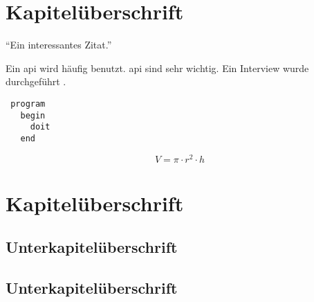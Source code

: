 \documentclass{custom}
\begin{document}
\mycover
\myconfidentiality

\begin{frontmatter}

\mytableofcontents
\mylistoffigures
\mylistoftables
\mylistofacronyms

\end{frontmatter}

\begin{mainmatter}

\section{Kapitelüberschrift}

\enquote{Ein interessantes Zitat.} \cite[1]{test}

Ein \gls{api} wird häufig benutzt. \gls{api} sind sehr wichtig. Ein Interview wurde durchgeführt .

\begin{verbatim}
 program
   begin
     doit
   end
\end{verbatim}

\begin{equation}
V= \pi \cdot r^{2} \cdot h
\end{equation}

\lipsum

\section{Kapitelüberschrift}

\lipsum

\subsection{Unterkapitelüberschrift}

\lipsum

\subsection{Unterkapitelüberschrift}

\lipsum

\end{mainmatter}

\begin{backmatter}

\mybibliography

\mylistofappendices


\mydeclaration

\end{backmatter}
\end{document}
